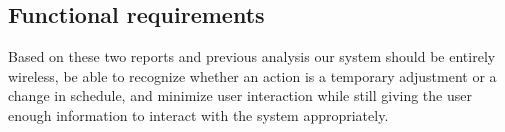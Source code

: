 \subsection{Functional requirements}
Based on these two reports and previous analysis our system should be entirely wireless, be able to recognize whether an action is a temporary adjustment or a change in schedule, and minimize user interaction while still giving the user enough information to interact with the system appropriately.
